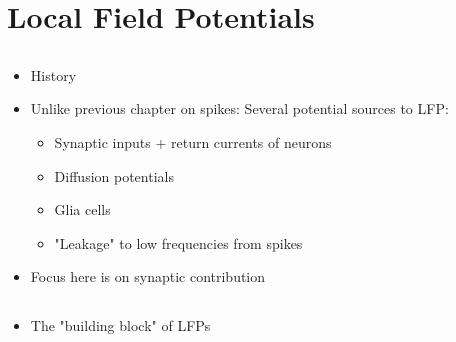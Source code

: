 \chapter{Local Field Potentials}
\label{chap:LFP}

\section{}

\begin{itemize}
\item History
\item Unlike previous chapter on spikes: Several potential sources to LFP:
\begin{itemize}
\item Synaptic inputs + return currents of neurons
\item Diffusion potentials
\item Glia cells
\item "Leakage" to low frequencies from spikes 
\end{itemize}
\item Focus here is on synaptic contribution
\end{itemize}

\section{}

\begin{itemize}
\item The "building block" of LFPs
\end{itemize}

\subsection{}

\subsection{}

\subsection{}

